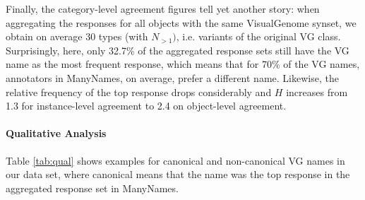 Finally, the category-level agreement figures tell yet another story: when aggregating the responses for all objects with the same VisualGenome synset, we obtain on average 30 types (with $N_{>1})$, i.e. variants of the original VG class. 
Surprisingly, here, only 32.7\% of the aggregated response sets still have the VG name as the most frequent response, which means that for 70\% of the VG names, annotators in ManyNames, on average, prefer a different name.  
Likewise, the relative frequency of the top response drops considerably and $H$ increases from 1.3 for instance-level agreement to 2.4 on object-level agreement.  
%

\paragraph{Qualitative Analysis}

 Table \ref{tab:qual} shows examples for canonical and non-canonical VG names in our data set, where canonical means that the name was the top response in the aggregated response set in ManyNames.

